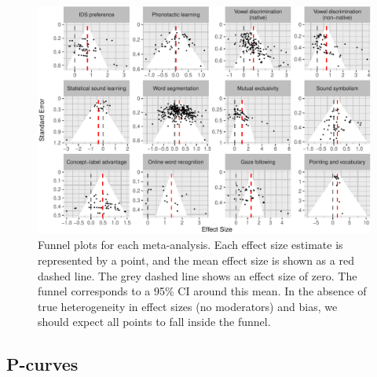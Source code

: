 \documentclass[9pt,twocolumn,twoside,lineno]{pnas-new}
\begin{document}
\begin{figure}[tbhp]
\centering
\includegraphics{figs/unnamed-chunk-2-1.pdf}
\caption{Funnel plots for each meta-analysis. Each effect size estimate
is represented by a point, and the mean effect size is shown as a red
dashed line. The grey dashed line shows an effect size of zero. The
funnel corresponds to a 95\% CI around this mean. In the absence of true
heterogeneity in effect sizes (no moderators) and bias, we should expect
all points to fall inside the funnel.}
\end{figure}

\subsection*{P-curves}\label{p-curves}
\end{document}
